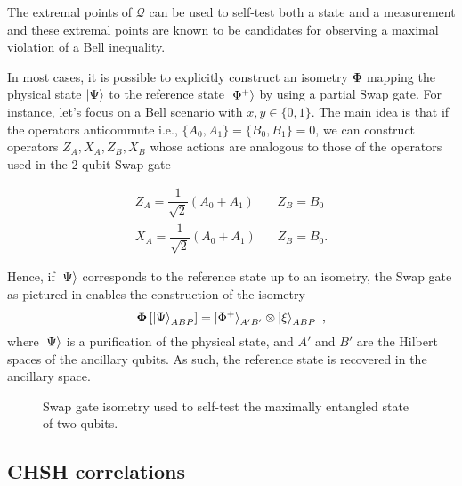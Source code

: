 \begin{proposition}
The extremal points of $\mathcal{Q}$ can be used to self-test both a state and a
measurement \cite{bell-viol-self-test} and these extremal points are known
to be candidates for observing a maximal violation of a Bell inequality.
\end{proposition}

In most cases, it is possible to explicitly construct an isometry $\mathbf{\Phi}$ mapping the
physical state $\ket{\Psi}$ to the reference state $\ket{\Phi^+}$ by using a partial Swap gate.
For instance, let's focus on a Bell scenario with $x,y\in\{0,1\}$. The main idea is that if the
operators anticommute i.e., $\{A_0,A_1\}=\{B_0,B_1\}=0$, we can construct operators $Z_A,X_A,Z_B,X_B$ whose actions
are analogous to those of the operators used in the 2-qubit Swap gate 

\begin{equation}
    \begin{aligned}
        Z_A = \dfrac{1}{\sqrt{2}} (A_0 +A_1)\ \ &\  \ Z_B = B_0 \\ 
        X_A = \dfrac{1}{\sqrt{2}} (A_0 +A_1)\ \ &\ \ Z_B = B_0. 
    \end{aligned}
\end{equation}

Hence, if $\ket{\Psi}$ corresponds to the reference state up to an isometry, the Swap gate as pictured in  enables the construction of the isometry 
\begin{equation}
    \mathbf{\Phi}\left[ \ket{\Psi}_{ABP}\right] = \ket{\Phi^+}_{A{'}B{'}} \otimes \ket{\xi}_{ABP} \text{ ,}
\end{equation}
where $\ket{\Psi}$ is a purification of the physical state, and $A{'}$ and $B{'}$ are the Hilbert spaces of the ancillary qubits. As such, the reference state is recovered in the ancillary space.


\begin{figure}[t]
    \centering
    
    \caption{Swap gate isometry used to self-test the maximally entangled state of two qubits.}
    \label{fig:swap}
\end{figure}


\subsection{CHSH correlations}


